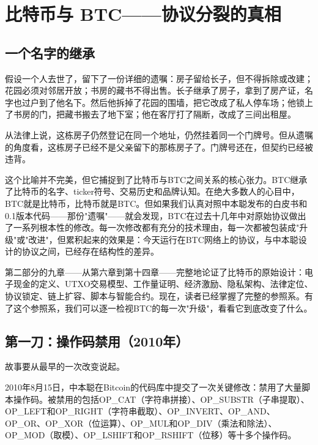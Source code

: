 \documentclass[a4paper,12pt,openany]{ctexbook}
\begin{document}
\chapter{比特币与 BTC——协议分裂的真相}



\section*{一个名字的继承}


假设一个人去世了，留下了一份详细的遗嘱：房子留给长子，但不得拆除或改建；花园必须对邻居开放；书房的藏书不得出售。长子继承了房子，拿到了房产证，名字也过户到了他名下。然后他拆掉了花园的围墙，把它改成了私人停车场；他锁上了书房的门，把藏书搬去了地下室；他在客厅打了隔断，改成了三间出租屋。

从法律上说，这栋房子仍然登记在同一个地址，仍然挂着同一个门牌号。但从遗嘱的角度看，这栋房子已经不是父亲留下的那栋房子了。门牌号还在，但契约已经被违背。

这个比喻并不完美，但它捕捉到了比特币与BTC之间关系的核心张力。BTC继承了比特币的名字、ticker符号、交易历史和品牌认知。在绝大多数人的心目中，BTC就是比特币，比特币就是BTC。但如果我们认真对照中本聪发布的白皮书和0.1版本代码——那份"遗嘱"——就会发现，BTC在过去十几年中对原始协议做出了一系列根本性的修改。每一次修改都有充分的技术理由，每一次都被包装成"升级"或"改进"，但累积起来的效果是：今天运行在BTC网络上的协议，与中本聪设计的协议之间，已经存在结构性的差异。

第二部分的九章——从第六章到第十四章——完整地论证了比特币的原始设计：电子现金的定义、UTXO交易模型、工作量证明、经济激励、隐私架构、法律定位、协议锁定、链上扩容、脚本与智能合约。现在，读者已经掌握了完整的参照系。有了这个参照系，我们可以逐一检视BTC的每一次"升级"，看看它到底改变了什么。


\section*{第一刀：操作码禁用（2010年）}


故事要从最早的一次改变说起。

2010年8月15日，中本聪在Bitcoin的代码库中提交了一次关键修改：禁用了大量脚本操作码。被禁用的包括OP\_CAT（字符串拼接）、OP\_SUBSTR（子串提取）、OP\_LEFT和OP\_RIGHT（字符串截取）、OP\_INVERT、OP\_AND、OP\_OR、OP\_XOR（位运算）、OP\_MUL和OP\_DIV（乘法和除法）、OP\_MOD（取模）、OP\_LSHIFT和OP\_RSHIFT（位移）等十多个操作码。
\end{document}
